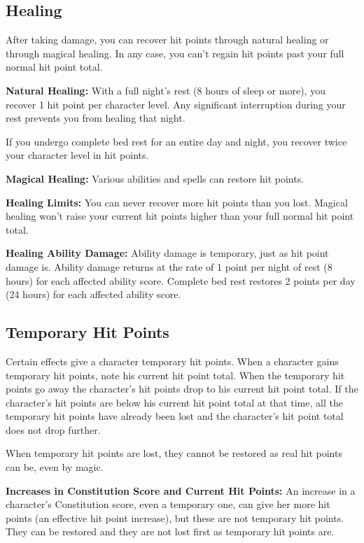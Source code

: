 \subsection{Healing}
After taking damage, you can recover hit points through natural healing or through magical healing. In any case, you can't regain hit points past your full normal hit point total.

\textbf{Natural Healing:} With a full night's rest (8 hours of sleep or more), you recover 1 hit point per character level. Any significant interruption during your rest prevents you from healing that night.

If you undergo complete bed rest for an entire day and night, you recover twice your character level in hit points.

\textbf{Magical Healing:} Various abilities and spells can restore hit points.

\textbf{Healing Limits:} You can never recover more hit points than you lost. Magical healing won't raise your current hit points higher than your full normal hit point total.

\textbf{Healing Ability Damage:} Ability damage is temporary, just as hit point damage is. Ability damage returns at the rate of 1 point per night of rest (8 hours) for each affected ability score. Complete bed rest restores 2 points per day (24 hours) for each affected ability score.

\subsection{Temporary Hit Points}
Certain effects give a character temporary hit points. When a character gains temporary hit points, note his current hit point total. When the temporary hit points go away the character's hit points drop to his current hit point total. If the character's hit points are below his current hit point total at that time, all the temporary hit points have already been lost and the character's hit point total does not drop further.

When temporary hit points are lost, they cannot be restored as real hit points can be, even by magic.

\textbf{Increases in Constitution Score and Current Hit Points:} An increase in a character's Constitution score, even a temporary one, can give her more hit points (an effective hit point increase), but these are not temporary hit points. They can be restored and they are not lost first as temporary hit points are.

